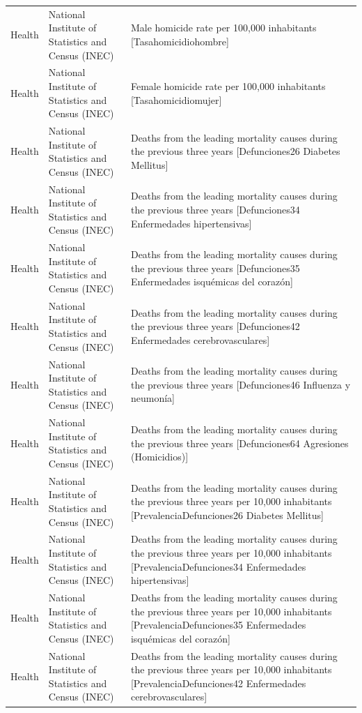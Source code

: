 \documentclass[10pt,a4paper]{article}
\begin{document}
\begin{longtable}{@{}>{\raggedright\arraybackslash}p{3.5cm}>{\raggedright\arraybackslash}p{5.6cm}>{\raggedright\arraybackslash}p{\dimexpr\textwidth-9.1cm-4\tabcolsep\relax}@{}}
Health & National Institute of Statistics and Census (INEC) & Male homicide rate per 100,000 inhabitants [Tasahomicidiohombre]\\
Health & National Institute of Statistics and Census (INEC) & Female homicide rate per 100,000 inhabitants [Tasahomicidiomujer]\\
Health & National Institute of Statistics and Census (INEC) & Deaths from the leading mortality causes during the previous three years [Defunciones26 Diabetes Mellitus]\\
Health & National Institute of Statistics and Census (INEC) & Deaths from the leading mortality causes during the previous three years [Defunciones34 Enfermedades hipertensivas]\\
Health & National Institute of Statistics and Census (INEC) & Deaths from the leading mortality causes during the previous three years [Defunciones35 Enfermedades isqu\'{e}micas del coraz\'{o}n]\\
Health & National Institute of Statistics and Census (INEC) & Deaths from the leading mortality causes during the previous three years [Defunciones42 Enfermedades cerebrovasculares]\\
Health & National Institute of Statistics and Census (INEC) & Deaths from the leading mortality causes during the previous three years [Defunciones46 Influenza y neumon\'{i}a]\\
Health & National Institute of Statistics and Census (INEC) & Deaths from the leading mortality causes during the previous three years [Defunciones64 Agresiones (Homicidios)]\\
Health & National Institute of Statistics and Census (INEC) & Deaths from the leading mortality causes during the previous three years per 10,000 inhabitants [PrevalenciaDefunciones26 Diabetes Mellitus]\\
Health & National Institute of Statistics and Census (INEC) & Deaths from the leading mortality causes during the previous three years per 10,000 inhabitants [PrevalenciaDefunciones34 Enfermedades hipertensivas]\\
Health & National Institute of Statistics and Census (INEC) & Deaths from the leading mortality causes during the previous three years per 10,000 inhabitants [PrevalenciaDefunciones35 Enfermedades isqu\'{e}micas del coraz\'{o}n]\\
Health & National Institute of Statistics and Census (INEC) & Deaths from the leading mortality causes during the previous three years per 10,000 inhabitants [PrevalenciaDefunciones42 Enfermedades cerebrovasculares]\\

\end{longtable}
\end{document}
